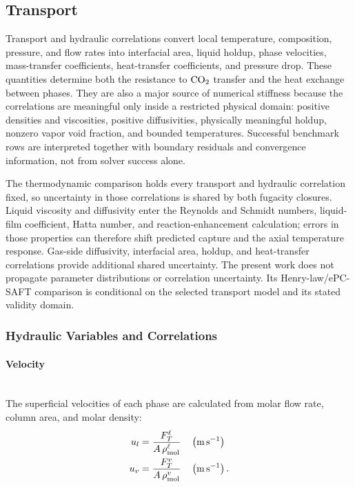         \subsection{Transport}\label{subsec:transport}
            Transport and hydraulic correlations convert local temperature, composition, pressure, and flow rates into interfacial area, liquid holdup, phase velocities, mass-transfer coefficients, heat-transfer coefficients, and pressure drop. These quantities determine both the resistance to $\COtwo$ transfer and the heat exchange between phases. They are also a major source of numerical stiffness because the correlations are meaningful only inside a restricted physical domain: positive densities and viscosities, positive diffusivities, physically meaningful holdup, nonzero vapor void fraction, and bounded temperatures. Successful benchmark rows are interpreted together with boundary residuals and convergence information, not from solver success alone.

            The thermodynamic comparison holds every transport and hydraulic correlation fixed, so uncertainty in those correlations is shared by both fugacity closures. Liquid viscosity and diffusivity enter the Reynolds and Schmidt numbers, liquid-film coefficient, Hatta number, and reaction-enhancement calculation; errors in those properties can therefore shift predicted capture and the axial temperature response. Gas-side diffusivity, interfacial area, holdup, and heat-transfer correlations provide additional shared uncertainty. The present work does not propagate parameter distributions or correlation uncertainty. Its Henry-law/ePC-SAFT comparison is conditional on the selected transport model and its stated validity domain.

            \subsubsection{Hydraulic Variables and Correlations}
                \paragraph{Velocity}\mbox{}\\[0.5em]
                The superficial velocities of each phase are calculated from molar flow rate, column area, and molar density:
                \begin{align}
                    u_l &= \frac{F^{\liq}_{T}}{A \,\rho^{\liq}_{ \text{mol}}}
                    && \left(\unit{m\,s^{-1}}\right)\\
                    u_v &= \frac{F^{\vap}_{T}}{A \,\rho^{\vap}_{ \text{mol}}}
                    && \left(\unit{m\,s^{-1}}\right).
                \end{align}

